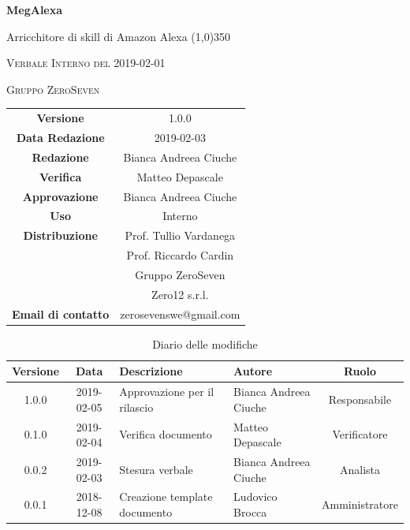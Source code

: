 \documentclass[a4paper,12pt]{article}
\author{Bianca Andreea Ciuche}
\date{2019-02-01}
\begin{document}
	\begin{titlepage}
		\centering
		{\huge\bfseries MegAlexa\par}
		Arricchitore di skill di Amazon Alexa
		\line(1,0){350} \\
		{\scshape\LARGE Verbale Interno del 2019-02-01 \par}
		\vspace{1cm}
		{\scshape Gruppo ZeroSeven \par}
		\logo
		\begin{tabular}{c|c}
			{\hfill \textbf{Versione}} 			& 1.0.0				\\
			{\hfill\textbf{Data Redazione}} 	& 2019-02-03		\\ 
			{\hfill\textbf{Redazione}} 			&  		Bianca Andreea Ciuche		\\ 
			{\hfill\textbf{Verifica}} 				&  	  	Matteo Depascale\\ 
			{\hfill\textbf{Approvazione}} 		&  	Bianca Andreea Ciuche\\ 
			{\hfill\textbf{Uso}} 					& 	Interno	\\ 
			{\hfill\textbf{Distribuzione}} 			& 			Prof. Tullio Vardanega \\ & Prof. Riccardo Cardin \\ & Gruppo ZeroSeven \\ & Zero12 s.r.l.	\\ 
			{\hfill\textbf{Email di contatto}} & zerosevenswe@gmail.com \\
		\end{tabular}
	\end{titlepage}
	
	
	
	\label{LastFrontPage}
	
	
	\newpage
	\cleardoublepage
	\begin{table}[tbph]
		\centering
		\begin{tabularx}{\textwidth}{|c|c|X|X|c|}
			\hline
			\textbf{Versione} & \textbf{Data} & \textbf{Descrizione} & \textbf{Autore} & \textbf{Ruolo} \\
			\hline
			1.0.0 & 2019-02-05 & Approvazione per il rilascio &Bianca Andreea Ciuche  & Responsabile \\
			\hline
			0.1.0 & 2019-02-04 & Verifica documento & Matteo Depascale  & Verificatore \\
			\hline
			0.0.2 & 2019-02-03 & Stesura verbale &Bianca Andreea Ciuche  & Analista \\
			\hline
			0.0.1 & 2018-12-08 & Creazione template documento & Ludovico Brocca & Amministratore\\
			\hline
		\end{tabularx}
		\caption{Diario delle modifiche}
	\end{table}
	\cleardoublepage
	\pagestyle{mymain}
	
\end{document}

